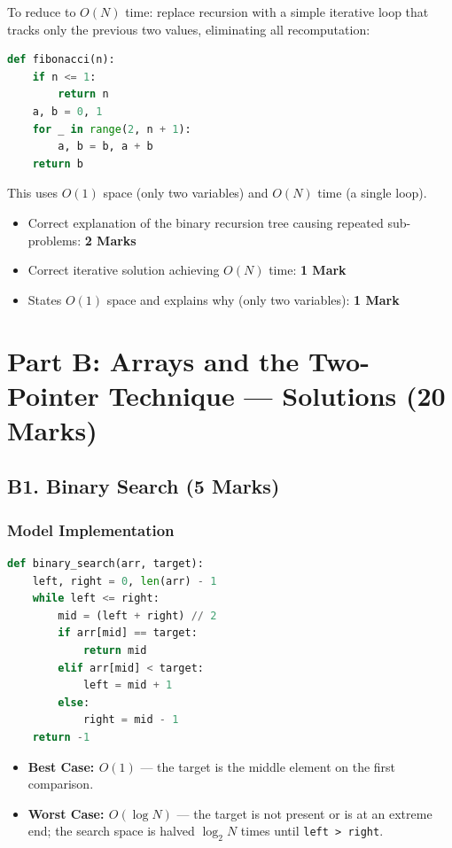 \documentclass[11pt,a4paper]{article}
\newenvironment{markbox}[1]{%
    \begin{tcolorbox}[colback=markgreen!6!white, colframe=markgreen, title=\textbf{Mark Allocation --- #1}]
}{%
    \end{tcolorbox}
}
\begin{document}
To reduce to $O(N)$ time: replace recursion with a simple iterative loop that tracks only the previous two values, eliminating all recomputation:
\begin{lstlisting}[language=Python]
def fibonacci(n):
    if n <= 1:
        return n
    a, b = 0, 1
    for _ in range(2, n + 1):
        a, b = b, a + b
    return b
\end{lstlisting}
This uses $O(1)$ space (only two variables) and $O(N)$ time (a single loop).

\begin{markbox}{A5 --- 4 Marks}
\begin{itemize}
    \item Correct explanation of the binary recursion tree causing repeated sub-problems: \textbf{2 Marks}
    \item Correct iterative solution achieving $O(N)$ time: \textbf{1 Mark}
    \item States $O(1)$ space and explains why (only two variables): \textbf{1 Mark}
\end{itemize}
\end{markbox}

\newpage

\section{Part B: Arrays and the Two-Pointer Technique --- Solutions (20 Marks)}

\subsection*{B1. Binary Search (5 Marks)}

\subsubsection*{Model Implementation}
\begin{lstlisting}[language=Python]
def binary_search(arr, target):
    left, right = 0, len(arr) - 1
    while left <= right:
        mid = (left + right) // 2
        if arr[mid] == target:
            return mid
        elif arr[mid] < target:
            left = mid + 1
        else:
            right = mid - 1
    return -1
\end{lstlisting}

\begin{itemize}
    \item \textbf{Best Case: $O(1)$} --- the target is the middle element on the first comparison.
    \item \textbf{Worst Case: $O(\log N)$} --- the target is not present or is at an extreme end; the search space is halved $\log_2 N$ times until \texttt{left > right}.
\end{itemize}
\end{document}
